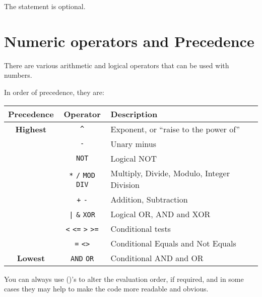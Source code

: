 The  statement is optional.

\section{Numeric operators and Precedence}
There are various arithmetic and logical operators that can be
used with numbers.

In order of precedence, they are:
\begin{center}
\begin{tabular}[t]{|c|c|l|}
\hline
{\bf Precedence}	& {\bf Operator}	& {\bf Description}\\
\hline
\hline
{\bf Highest}	&\texttt{\^}	& Exponent, or ``raise to the power of''\\ 
\hline
		&\texttt{-}	& Unary minus\\
\hline
		&\texttt{NOT}	& Logical NOT\\
\hline
		&\texttt{*}\hspace{3mm} 
		\texttt{/}\hspace{3mm}
		\texttt{MOD} 
		\hspace{3mm}
		\texttt{DIV}	& Multiply, Divide, Modulo, Integer Division\\
\hline
		&\texttt{+}\hspace{3mm}
		\texttt{-}	& Addition, Subtraction\\
\hline
		&\texttt{|}\hspace{3mm}
		\texttt{\&}\hspace{3mm}
		\texttt{XOR}	& Logical OR, AND and XOR\\
\hline
		&\texttt{<}\hspace{3mm}
		\texttt{<=}\hspace{3mm}
		\texttt{>}\hspace{3mm}
		\texttt{>=}	& Conditional tests\\
\hline
		&\texttt{=}\hspace{3mm}
		\texttt{<>}	& Conditional Equals and Not Equals\\
\hline
{\bf Lowest}	&\texttt{AND}\hspace{3mm} 
		\texttt{OR}	& Conditional AND and OR\\
\hline
\end{tabular}
\end{center}

You can always use ()'s to alter the evaluation order, if required,
and in some cases they may help to make the code more readable and
obvious.


